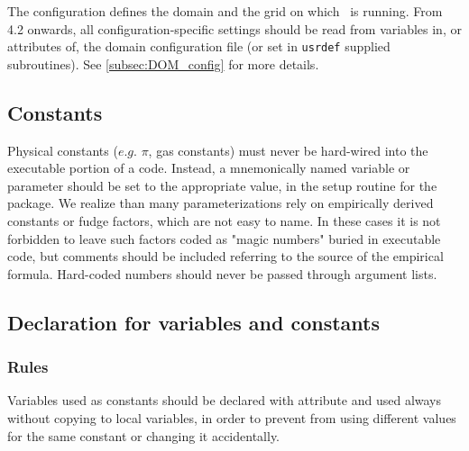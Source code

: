 The configuration defines the domain and the grid on which \NEMO\ is running.  From 4.2
onwards, all configuration-specific settings should be read from variables in, or
attributes of, the domain configuration file (or set in \texttt{usrdef} supplied
subroutines). See \autoref{subsec:DOM_config} for more details.

\subsection{Constants}

Physical constants ($e.g.$ $\pi$, gas constants) must never be hard-wired into the executable portion of a code.
Instead, a mnemonically named variable or parameter should be set to the appropriate value,
in the setup routine for the package.
We realize than many parameterizations rely on empirically derived constants or fudge factors,
which are not easy to name.
In these cases it is not forbidden to leave such factors coded as "magic numbers" buried in executable code, but
comments should be included referring to the source of the empirical formula.
Hard-coded numbers should never be passed through argument lists.

\subsection{Declaration for variables and constants}

\subsubsection{Rules}

Variables used as constants should be declared with attribute  and
used always without copying to local variables, in order to
prevent from using different values for the same constant or changing it accidentally.

